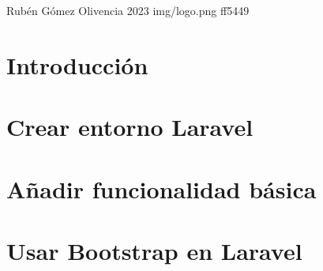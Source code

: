 \documentclass{\ClassPath/yukibook}
\begin{document}
    {Rubén Gómez Olivencia}  %
    {2023}    %
    {} %
    {} %
    {} %
    {img/logo.png} %
    {ff5449}
    {} %

    \coverpage
    \graphicspath{{../../yukibook.cls/}}
    \licensepage
    \tableofcontents

    \graphicspath{{img/}}

    \part{Introducción}
    
    

    \part{Crear entorno Laravel}
    
    

    \part{Añadir funcionalidad básica}
    

    \part{Usar Bootstrap en Laravel}
    
\end{document}
